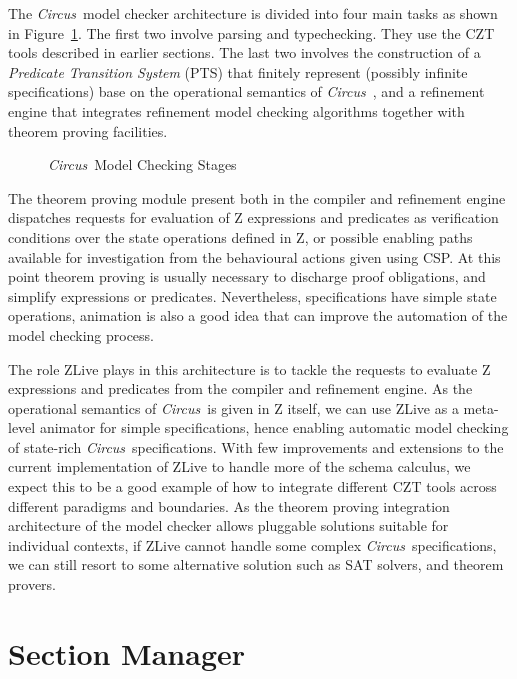 \documentclass{llncs}
\newcommand{\Circus}{{\sf\slshape Circus}}
\begin{document}
    The \Circus\ model checker architecture is divided into four main tasks as shown in Figure~\ref{mc-stages}.
    The first two involve parsing and typechecking. They use the CZT tools described in earlier
    sections. The last two involves the construction of a \textit{Predicate Transition System}
    (PTS) that finitely represent (possibly infinite specifications) base on the operational semantics
    of \Circus~\cite{circus.mc:opsem}, and a refinement engine that integrates refinement model checking
    algorithms together with theorem proving facilities.
    \begin{figure}[t]
    \begin{center}
    \end{center}    \caption{\Circus\ Model Checking Stages}\label{mc-stages}
    \end{figure}
    The theorem proving module present both in the compiler and refinement engine dispatches requests
    for evaluation of Z expressions and predicates as verification conditions over the state operations
    defined in Z, or possible enabling paths available for investigation from the behavioural actions
    given using CSP.
    At this point theorem proving is usually necessary to discharge proof obligations, and simplify
    expressions or predicates. Nevertheless, specifications have simple state operations, animation
    is also a good idea that can improve the automation of the model checking process.

    The role ZLive plays in this architecture is to tackle the requests to evaluate
    Z expressions and predicates from the compiler and refinement engine.
    As the operational semantics of \Circus\ is given in Z itself, we can use ZLive as a
    meta-level animator for simple specifications, hence enabling automatic model checking
    of state-rich \Circus\ specifications.
    With few improvements and extensions to the current implementation of ZLive to handle
    more of the schema calculus, we expect this to be a good example of how to integrate
    different CZT tools across different paradigms and boundaries.
    As the theorem proving integration architecture of the model checker allows pluggable
    solutions suitable for individual contexts, if ZLive cannot handle some complex \Circus\
    specifications, we can still resort to some alternative solution such as SAT solvers,
    and theorem provers.

\section{Section Manager}
\label{section-manager}
\end{document}
